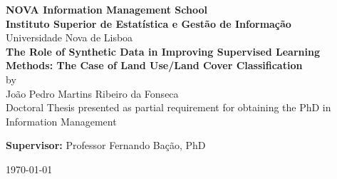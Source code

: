 \thispagestyle{empty}
\begin{titlepage}
    \begin{center}
        \large{\textbf{\textsf{NOVA Information Management School}}}
        \vspace{0.2cm}\\
        \large{\textbf{\textsf{Instituto Superior de Estatística e Gestão de Informação}}}
        \vspace{0.2cm}\\
        \large{Universidade Nova de Lisboa}
        \vspace{3.5cm}\\

        \LARGE{\textbf{\textsf{%
            The Role of Synthetic Data in Improving Supervised Learning
            Methods: The Case of Land Use/Land Cover Classification
        }}}
        \vspace{1cm}\\
        \large{by}
        \vspace{1cm}\\
        \large{João Pedro Martins Ribeiro da Fonseca}
        \vspace{3.5cm}\\
        \large{\textsf{Doctoral Thesis presented as partial requirement for
        obtaining the PhD in Information Management}}
        \vspace{3cm}\\
    \end{center}
	
    \textbf{\textsf{Supervisor:}} Professor Fernando Bação, PhD

    \begin{center}
        \vspace{4cm}
        \monthyeardate\today
    \end{center}
	
\end{titlepage}
